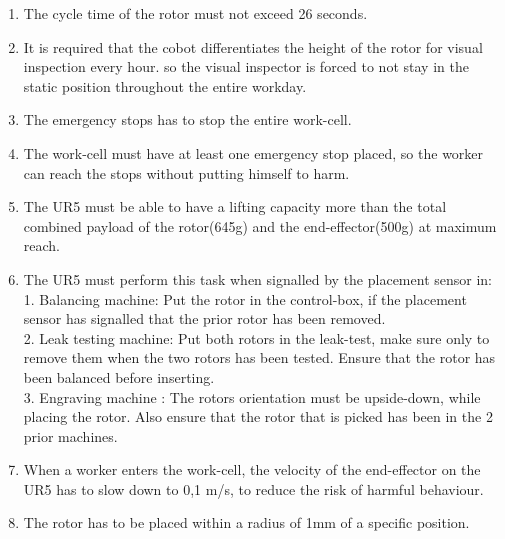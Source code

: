 \begin{enumerate}
    \item The cycle time of the rotor must not exceed 26 seconds.
    \item It is required that the cobot differentiates the height of the rotor for visual inspection every hour. so the visual inspector is forced to not stay in the static position throughout the entire workday.
    \item The emergency stops has to stop the entire work-cell.
    \item The work-cell must have at least one emergency stop placed, so the worker can reach the stops without putting himself to harm.
    \item The UR5 must be able to have a lifting capacity more than the total combined payload of the rotor(645g) and the end-effector(500g) at maximum reach.
    \item The UR5 must perform this task when signalled by the placement sensor in:\\
    1. Balancing machine: Put the rotor in the control-box, if the placement sensor has signalled that the prior rotor has been removed.\\
    2. Leak testing machine: Put both rotors in the leak-test, make sure only to remove them when the two rotors has been tested. Ensure that the rotor has been balanced before inserting.\\
    3. Engraving machine : The rotors orientation must be upside-down, while placing the rotor. Also ensure that the rotor that is picked has been in the 2 prior machines.
    \item When a worker enters the work-cell, the velocity of the end-effector on the UR5 has to slow down to 0,1 m/s, to reduce the risk of harmful behaviour.
    \item The rotor has to be placed within a radius of 1mm of a specific position. 
    \end{enumerate}


